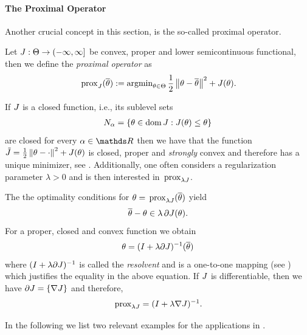 \paragraph{The Proximal Operator} Another crucial concept in this section, is the so-called proximal operator.
%
\begin{definition}{}{}
Let $J:\Theta\to(-\infty,\infty]$  be convex, proper and lower semicontinuous functional, then we define the \emph{proximal operator} as
\begin{align*}
    \,\mathrm{prox}_{J}(\overline{\theta}) := \operatorname{argmin}_{\theta\in\Theta} \frac{1}{2}\left\|\theta-\overline{\theta}\right\|^2 + J(\theta).
\end{align*}
\end{definition}
%
\noindent%
If $J$ is a closed function, i.e., its sublevel sets
%
\begin{align*}
N_\alpha = \{\theta\in\operatorname{dom} J: J(\theta)\leq \theta\}
\end{align*} 
%
are closed for every $\alpha\in\R$ then we have that the function $\tilde J = \frac{1}{2}\left\|\theta -\cdot\right\|^2 + J(\theta)$ is closed, proper and \emph{strongly} convex and therefore has a unique minimizer, see \cite[Thm. 27.1]{rockafellar1997convex}. Additionally, one often considers a regularization parameter $\lambda>0$ and is then interested in $\,\mathrm{prox}_{\lambda J}$.
%
\begin{remark}{}{}
The the optimality conditions for $\theta=\,\mathrm{prox}_{\lambda J}(\overline{\theta})$ yield 
%
\begin{align*}
\pparam - \param \in \lambda\, \partial \func(\param).%
\end{align*}
%
For a proper, closed and convex function we obtain
%
\begin{align*}
\theta = (I + \lambda\partial J)^{-1}(\overline\theta)
\end{align*}
%
where $(I + \lambda\partial J)^{-1}$ is called the \emph{resolvent} and is a one-to-one mapping (see \cite[Ch. 3.2]{parikh2014proximal})  which justifies the equality in the above equation. If $J$ is differentiable, then we have $\partial J = \{\nabla J\}$ and therefore,
%
\begin{align*}
\,\mathrm{prox}_{\lambda J} = (I + \lambda\nabla J)^{-1}.
\end{align*}
\end{remark}
%
%
\noindent%
In the following we list two relevant examples for the applications in \cite{bungert2022bregman, bungert2021neural}.
%
